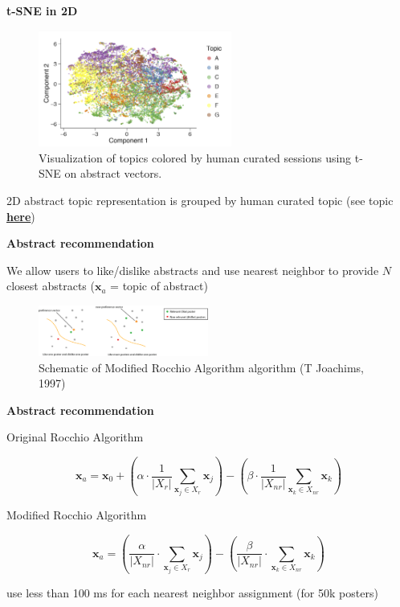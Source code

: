 \begin{frame}{\textbf{t-SNE in 2D}}

\begin{figure}
\includegraphics[width=2.5in]{images/tsne}\\
\tiny{Visualization of topics colored by human curated sessions using t-SNE on abstract vectors.}
\end{figure}

2D abstract topic representation is grouped by human curated topic
(see topic \href{https://github.com/titipata/science_concierge/wiki/Topic-in-SfN-2015}{\textbf{here}})

\end{frame}


\begin{frame}{\textbf{Abstract recommendation}}

We allow users to like/dislike abstracts and use nearest neighbor to provide $N$ closest abstracts ($\mathbf{x}_a$ = topic of abstract)

\begin{figure}
\includegraphics[width=2.2in]{images/like-dislike}\\
\tiny{Schematic of Modified Rocchio Algorithm algorithm (T Joachims, 1997)}
\end{figure}

\end{frame}


\begin{frame}{\textbf{Abstract recommendation}}

Original Rocchio Algorithm

\begin{equation*}
\mathbf{x}_a = \mathbf{x}_0 + (\alpha \cdot \frac{1}{\left| X_r \right|} \sum_{\mathbf{x}_j \in X_r} \mathbf{x}_j) - (\beta \cdot \frac{1}{\left| X_{nr} \right|} \sum_{\mathbf{x}_k \in X_{nr}} \mathbf{x}_k)
\end{equation*}

Modified Rocchio Algorithm

\begin{equation*}
\mathbf{x}_a = (\frac{\alpha}{\left| X_{nr} \right|} \cdot \sum_{\mathbf{x}_j \in X_r} \mathbf{x}_j) - (\frac{\beta}{\left| X_{nr} \right|} \cdot \sum_{\mathbf{x}_k \in X_{nr}} \mathbf{x}_k)
\end{equation*}

use less than 100 ms for each nearest neighbor assignment (for 50k posters)

\end{frame}

